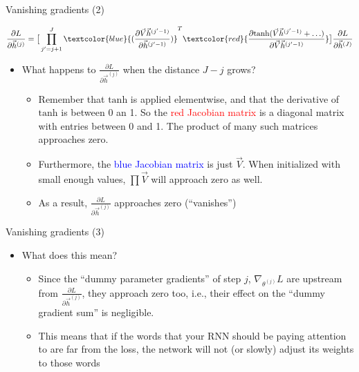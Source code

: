 \documentclass[11pt,compress,t,notes=noshow, xcolor=table]{beamer}
\begin{document}
\begin{vbframe}{Vanishing gradients (2)}

\vfill

$$
\frac{\partial L}{\partial \vec h^{(j)}} = \big[\prod_{j'=j+1}^{J} \textcolor{blue}{(\frac{\partial \vec V \vec h^{(j'-1)}}{\partial \vec h^{(j'-1)}})}^T \textcolor{red}{ \frac{\partial \mathrm{tanh}(\vec V \vec h^{(j'-1)} + \ldots)}{\partial \vec V \vec h^{(j'-1)}}} \big] \frac{\partial L}{\partial \vec h^{(J)}}
$$
\begin{itemize}
	\item What happens to $\frac{\partial L}{\partial \vec h^{(j)}}$ when the distance $J-j$ grows?
		\begin{itemize}
			\item Remember that $\mathrm{tanh}$ is applied elementwise, and that the derivative of $\mathrm{tanh}$ is between 0 an 1. So the \textcolor{red}{red Jacobian matrix} is a diagonal matrix with entries between 0 and 1.
			The product of many such matrices approaches zero.
			\item Furthermore, the \textcolor{blue}{blue Jacobian matrix} is just $\vec V$. When initialized with small enough values, $\prod \vec V$ will approach zero as well.
			\item As a result, $\frac{\partial L}{\partial \vec h^{(j)}}$ approaches zero (``vanishes'')
		\end{itemize}
\end{itemize}

\vfill

\end{vbframe}


\begin{vbframe}{Vanishing gradients (3)}

\vfill

\begin{itemize}
\item What does this mean?
	\begin{itemize}
		\item Since the ``dummy parameter gradients'' of step $j$, $\nabla_{\theta^{(j)}} L$ are upstream from $\frac{\partial L}{\partial \vec h^{(j)}}$, they approach zero too, i.e., their effect on the ``dummy gradient sum'' is negligible.
		\item This  means that if the words that your RNN should be paying attention to are far from the loss, the network will not (or slowly) adjust its weights to those words
	\end{itemize}
\end{itemize}

\vfill

\end{vbframe}
\end{document}
